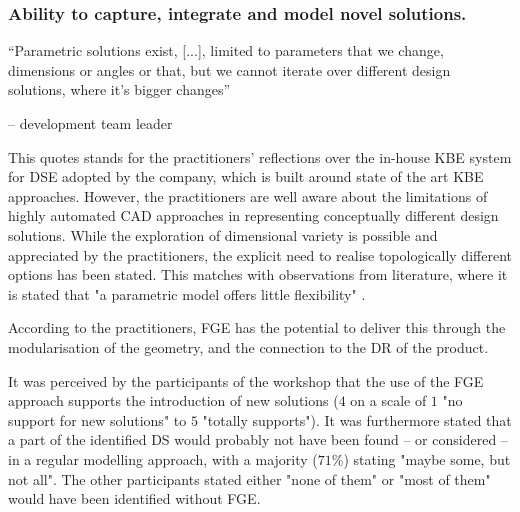 \documentclass[aerospace,article,submit,moreauthors,pdftex]{Definitions/mdpi}
\begin{document}
\subsubsection{Ability to capture, integrate and model novel solutions. }

\begin{center}
    “Parametric solutions exist, [...], limited to parameters that we change, dimensions or angles or that, but we cannot iterate over different design solutions, where it’s bigger changes” 
\end{center}
\begin{flushright}
    -- development team leader
\end{flushright}


This quotes stands for the practitioners' reflections over the in-house \ac{KBE} system for DSE adopted by the company, which is built around state of the art KBE approaches.
However, the practitioners are well aware about the limitations of highly automated CAD approaches in representing conceptually different design solutions.
While the exploration of dimensional variety is possible and appreciated by the practitioners, the explicit need to realise topologically different options has been stated.
This matches with observations from literature, where it is stated that "a parametric model offers little flexibility" \cite{Li2020UsingIntegration}.

According to the practitioners, FGE has the potential to deliver this through the modularisation of the geometry, and the connection to the \ac{DR} of the product.

It was perceived by the participants of the workshop that the use of the \ac{FGE} approach supports the introduction of new solutions ($4$ on a scale of $1$ "no support for new solutions" to $5$ "totally supports").
It was furthermore stated that a part of the identified \ac{DS} would probably not have been found -- or considered -- in a regular modelling approach, with a majority ($71\%$) stating "maybe some, but not all".
The other participants stated either "none of them" or "most of them" would have been identified without \ac{FGE}.
\end{document}
